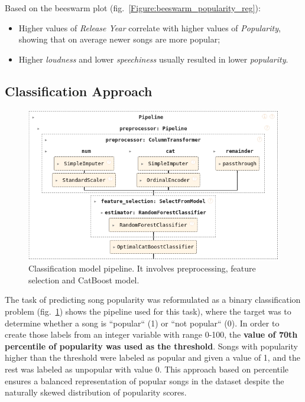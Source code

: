 Based on the beeswarm plot (fig.~\ref{Figure:beeswarm_popularity_reg}):
\begin{itemize}
  \item Higher values of \textit{Release Year} correlate with higher values of
    \textit{Popularity}, showing that on average newer songs are more
    popular;
  \item Higher \textit{loudness} and lower \textit{speechiness}
    usually resulted in lower \textit{popularity}.
\end{itemize}



\subsection{Classification Approach}

\begin{center}
\begin{figure}[H]
  \centering
  \includegraphics[width=6in]{img/clf_pipeline.png}
  \caption{Classification model pipeline. It involves preprocessing, feature
  selection and CatBoost model.}
  \label{Figure:clf_pipeline}
\end{figure}
\end{center}

The task of predicting song popularity was reformulated as a binary
classification problem (fig.~\ref{Figure:clf_pipeline}) shows the pipeline used
for this task), where the target was to determine whether a song is ``popular``
(1) or ``not popular`` (0). In order to create those labels from an integer
variable with range 0-100, the \textbf{value of 70th percentile of popularity
was used as the threshold}. Songs with popularity higher than the threshold
were labeled as popular and given a value of 1, and the rest was labeled as
unpopular with value 0. This approach based on percentile ensures a balanced
representation of popular songs in the dataset despite the naturally skewed
distribution of popularity scores.

